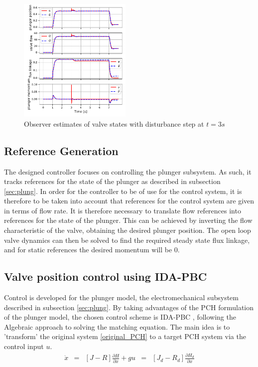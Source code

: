 \documentclass[letterpaper, 10pt, conference]{ieeeconf}
\begin{document}

\begin{figure}[!ht]
    \includegraphics[width=0.48\textwidth]{combined_plots_obs_F.pdf}
    \caption{Observer estimates of valve states with disturbance step at $t=3s$}
    \label{fig:flowhat_F}
\end{figure}

\subsection{Reference Generation}
The designed controller focuses on controlling the plunger subsystem. As such, it tracks references for the state of the plunger as described in subsection \ref{sec:plung}. In order for the controller to be of use for the control system, it is therefore to be taken into account that references for the control system are given in terms of flow rate. It is therefore necessary to translate flow references into references for the state of the plunger. This can be achieved by inverting the flow characteristic of the valve, obtaining the desired plunger position. The open loop valve dynamics can then be solved to find the required steady state flux linkage, and for static references the desired momentum will be 0.

\subsection{Valve position control using IDA-PBC}
Control is developed for the plunger model, the electromechanical subsystem described in subsection \ref{sec:plung}.
By taking advantages of the PCH formulation of the plunger model, the chosen control scheme is IDA-PBC \cite{IDAPBC}, following the Algebraic approach to solving the matching equation. The main idea is to 'transform' the original system \ref{original_PCH} to a target PCH system via the control input $u$. 
\begin{equation}
    \begin{aligned}
    \dot{x} &=& [J-R]\frac{\partial H}{\partial x} + gu &=& [J_{d}- R_{d}]\frac{\partial H_{d}}{\partial x}
\end{aligned}
\end{equation}\label{eq:IDA_principle}
\end{document}
